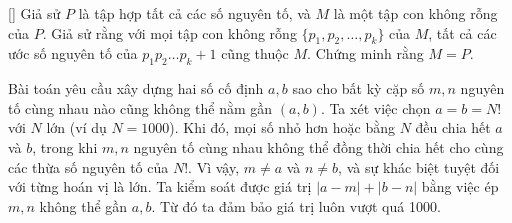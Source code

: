 \documentclass[../09-contruction-methods.tex]{subfiles}
\begin{document}
\begin{example*}\label{example:USA-2015-TSTST-P3}[\textbf{}]
    Giả sử \( P \) là tập hợp tất cả các số nguyên tố, và \( M \) là một tập con không rỗng của \( P \).
    Giả sử rằng với mọi tập con không rỗng \( \{p_1, p_2, \ldots, p_k\} \) của \( M \), tất cả các ước số nguyên tố của \( p_1p_2\ldots p_k + 1 \) cũng thuộc \( M \).
    Chứng minh rằng \( M = P \).
\end{example*}

\begin{story*}
    Bài toán yêu cầu xây dựng hai số cố định \( a, b \) sao cho bất kỳ cặp số \( m, n \) nguyên tố cùng nhau nào cũng không thể nằm gần \( (a, b) \).
    Ta xét việc chọn \( a = b = N! \) với \( N \) lớn (ví dụ \( N = 1000 \)).
    Khi đó, mọi số nhỏ hơn hoặc bằng \( N \) đều chia hết \( a \) và \( b \),
    trong khi \( m, n \) nguyên tố cùng nhau không thể đồng thời chia hết cho cùng các thừa số nguyên tố của \( N! \).
    Vì vậy, \( m \ne a \) và \( n \ne b \), và sự khác biệt tuyệt đối với từng hoán vị là lớn.
    Ta kiểm soát được giá trị \( |a - m| + |b - n| \) bằng việc ép \( m, n \) không thể gần \( a, b \). Từ đó ta đảm bảo giá trị luôn vượt quá 1000.
\end{story*}

\bigbreak
\end{document}
